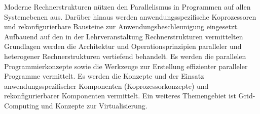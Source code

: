 \begin{module}
\begin{content}
Moderne Rechnerstrukturen nützen den Parallelismus in Programmen auf allen Systemebenen aus. Darüber hinaus werden anwendungsspezifische Koprozessoren und rekonfigurierbare Bausteine zur Anwendungsbeschleunigung eingesetzt. Aufbauend auf den in der Lehrveranstaltung Rechnerstrukturen vermittelten Grundlagen werden die Architektur und Operationsprinzipien paralleler und heterogener Rechnerstrukturen vertiefend behandelt. Es werden die parallelen Programmierkonzepte sowie die Werkzeuge zur Erstellung effizienter paralleler Programme vermittelt. Es werden die Konzepte und der Einsatz anwendungsspezifischer Komponenten (Koprozessorkonzepte) und rekonfigurierbarer Komponenten vermittelt. Ein weiteres Themengebiet ist Grid-Computing und Konzepte zur Virtualisierung.


\end{content}



\end{module}

